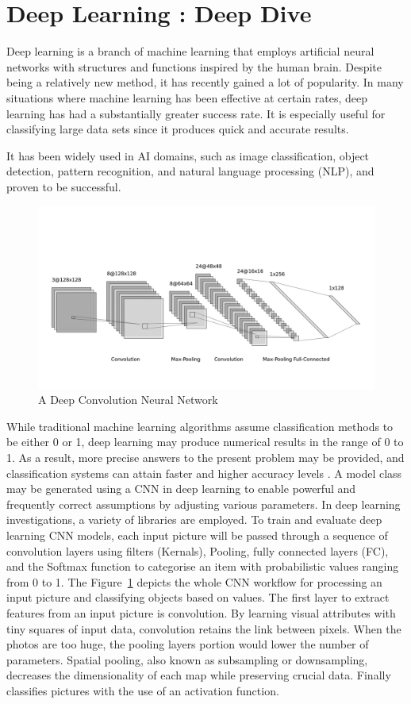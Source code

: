 \documentclass[12pt,letterpaper]{report}
\begin{document}
\section{Deep Learning : Deep Dive} \label{sec:deeplearning}
Deep learning is a branch of machine learning that employs artificial neural networks with structures and functions inspired by the human brain. Despite being a relatively new method, it has recently gained a lot of popularity. In many situations where machine learning has been effective at certain rates, deep learning has had a substantially greater success rate. It is especially useful for classifying large data sets since it produces quick and accurate results.

It has been widely used in AI domains, such as image classification, object detection, pattern recognition, and natural language processing (NLP), and proven to be successful.

\begin{figure}[h]
    \begin{center}
    \includegraphics[width=0.5\linewidth]{comp6961-report-cnn.png}
    \end{center}
       \caption{A Deep Convolution Neural Network\cite{DLwithTensor}\label{cnn}}
\end{figure}


While traditional machine learning algorithms assume classification methods to be either 0 or 1, deep learning may produce numerical results in the range of 0 to 1. As a result, more precise answers to the present problem may be provided, and classification systems can attain faster and higher accuracy levels \cite{dlEvo}. A model class may be generated using a CNN in deep learning to enable powerful and frequently correct assumptions by adjusting various parameters. In deep learning investigations, a variety of libraries are employed. To train and evaluate deep learning CNN models, each input picture will be passed through a sequence of convolution layers using filters (Kernals), Pooling, fully connected layers (FC), and the Softmax function to categorise an item with probabilistic values ranging from 0 to 1. The Figure~\ref{cnn} depicts the whole CNN workflow for processing an input picture and classifying objects based on values. The first layer to extract features from an input picture is convolution. By learning visual attributes with tiny squares of input data, convolution retains the link between pixels. When the photos are too huge, the pooling layers portion would lower the number of parameters. Spatial pooling, also known as subsampling or downsampling, decreases the dimensionality of each map while preserving crucial data. Finally classifies pictures with the use of an activation function.
\end{document}
